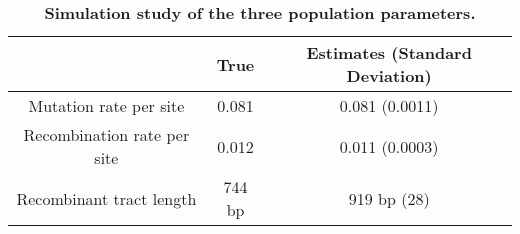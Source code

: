 \documentclass[10pt]{article}
\providecommand{\tabularnewline}{\\}
\begin{document}


\begin{table}[!ht]
\caption{
{\bf Simulation study of the three population parameters.}}
\noindent \begin{centering}
\begin{tabular}{ccc}
\hline
 & True & Estimates (Standard Deviation)\tabularnewline
\hline
Mutation rate per site & 0.081 & 0.081 (0.0011)\tabularnewline
Recombination rate per site & 0.012 & 0.011 (0.0003)\tabularnewline
Recombinant tract length & 744 bp & 919 bp (28)\tabularnewline
\hline
\end{tabular}
\par\end{centering}
\label{tab:sim-three}
\end{table}
\end{document}
